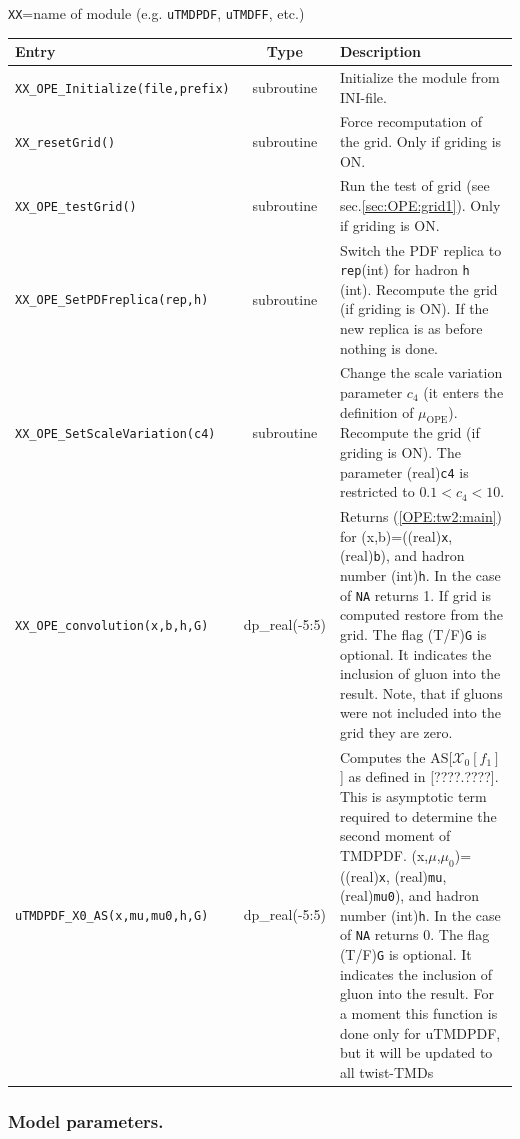 \documentclass[prd,nofootinbib,eqsecnum,final]{revtex4}
\renewcommand{\(}{\left(}
\renewcommand{\)}{\right)}
\renewcommand{\[}{\left[}
\renewcommand{\]}{\right]}
\newcommand{\red}[1]{{\color[rgb]{1,0,0} #1}}
\begin{document}
\begin{center}
\texttt{XX}=name of module (e.g. \texttt{uTMDPDF}, \texttt{uTMDFF}, etc.)
\\
\begin{tabular}{||p{5.5cm}||c||p{8.5cm}||}
\hline\hline
Entry &~~Type~~& Description
\\\hline
\texttt{XX\_OPE\_Initialize(file,prefix)} & subroutine & Initialize the module from INI-file.
\\\hline
\texttt{XX\_resetGrid()} & subroutine & Force recomputation of the grid. Only if griding is ON.
\\\hline
\texttt{XX\_OPE\_testGrid()} & subroutine & Run the test of grid (see sec.\ref{sec:OPE:grid1}).  Only if griding is ON.
\\\hline
\texttt{XX\_OPE\_SetPDFreplica(rep,h)} & subroutine & Switch the PDF replica to \texttt{rep}(int) for hadron \texttt{h} (int). Recompute the grid (if griding is ON). If the new replica is as before nothing is done.
\\\hline
\texttt{XX\_OPE\_SetScaleVariation(c4)} & subroutine & Change the scale variation parameter $c_4$ (it enters the definition of $\mu_{\text{OPE}}$). Recompute the grid (if griding is ON). The parameter (real)\texttt{c4} is restricted to $0.1<c_4<10$.
\\\hline\hline
\texttt{XX\_OPE\_convolution(x,b,h,G)} & dp\_real(-5:5) & Returns (\ref{OPE:tw2:main}) for (x,b)=((real)\texttt{x}, (real)\texttt{b}), and hadron number (int)\texttt{h}. In the case of \texttt{NA} returns 1. If grid is computed restore from the grid. The flag (T/F)\texttt{G} is optional. It indicates the inclusion of gluon into the result. Note, that if gluons were not included into the grid they are zero.
\\\hline\hline
\texttt{uTMDPDF\_X0\_AS(x,mu,mu0,h,G)} & dp\_real(-5:5) & Computes the AS[$\mathcal{X}_0[f_1]$] as defined in [????.????]. This is asymptotic term required to determine the second moment of TMDPDF. (x,$\mu$,$\mu_0$)=((real)\texttt{x}, (real)\texttt{mu}, (real)\texttt{mu0}), and hadron number (int)\texttt{h}. In the case of \texttt{NA} returns 0. The flag (T/F)\texttt{G} is optional. It indicates the inclusion of gluon into the result. \red{For a moment this function is done only for uTMDPDF, but it will be updated to all twist-TMDs}
\\\hline\hline
\end{tabular}
\end{center}

\subsubsection{Model parameters.} 
\end{document}
